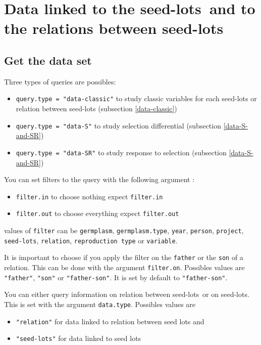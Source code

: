 \documentclass{article}\usepackage[]{graphicx}\usepackage[]{color}
\renewcommand{\sl}{seed-lots}
\begin{document}
\newpage


\section{Data linked to the \sl~and to the relations between \sl}
\label{data}


\subsection{Get the data set}

Three types of queries are possibles:
\begin{itemize}
\item \texttt{query.type = "data-classic"} to study classic variables for each seed-lots or relation between seed-lots (subsection \ref{data-classic})
\item \texttt{query.type = "data-S"} to study selection differential (subsection \ref{data-S-and-SR})
\item \texttt{query.type = "data-SR"} to study response to selection (subsection \ref{data-S-and-SR})
\end{itemize}

You can set filters to the query with the following argument :

\begin{itemize}
\item \texttt{filter.in} to choose nothing expect \texttt{filter.in}
\item \texttt{filter.out} to choose everything expect \texttt{filter.out}
\end{itemize}

values of \texttt{filter} can be \texttt{germplasm}, \texttt{germplasm.type}, \texttt{year}, \texttt{person}, \texttt{project}, \texttt{\sl}, \texttt{relation}, \texttt{reproduction type} or \texttt{variable}.


It is important to choose if you apply the filter on the \texttt{father} or the \texttt{son} of a relation.
This can be done with the argument \texttt{filter.on}.
Possibles values are \texttt{"father"}, \texttt{"son"} or \texttt{"father-son"}.
It is set by default to \texttt{"father-son"}.

You can either query information on relation between \sl~or on \sl.
This is set with the argument \texttt{data.type}.
Possibles values are 

\begin{itemize}
\item \texttt{"relation"} for data linked to relation between seed lots and 
\item \texttt{"seed-lots"} for data linked to seed lots
\end{itemize}
\end{document}
